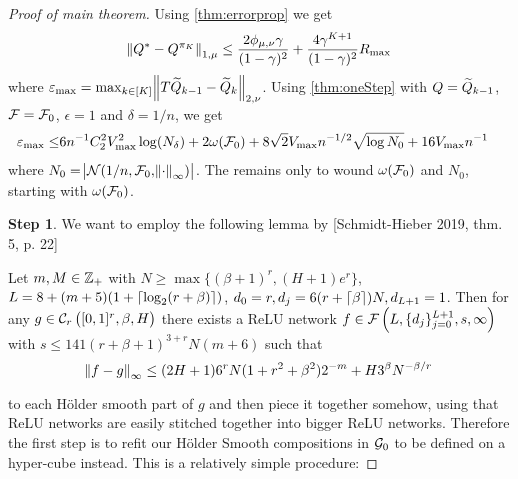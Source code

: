 




\begin{proof}[Proof of main theorem] %
  Using \cref{thm:errorprop} we get
  \begin{equation}
    \norm{Q^* - Q^{\pi_K}}_{1,\mu} \leq
    \frac{2 \phi_{\mu, \nu} \gamma}{(1-\gamma)^2} +
    \frac{4 \gamma^{K+1}}{(1-\gamma)^2} R_{\max}
    \label{eq:mp1}
  \end{equation}
  where $\varepsilon_{\max} =
  \max_{k \in [K]} \norm{T \widetilde{Q}_{k-1} - \widetilde{Q}_k}_{2, \nu}$.
  Using \cref{thm:oneStep} with $Q = \widetilde{Q}_{k-1}$,
  $\mathcal{F} = \mathcal{F}_0$, $\epsilon = 1$ and $\delta = 1/n$, we get
  \begin{align}
    \varepsilon_{\max} \leq & 6 n^{-1} C_2^2 V_{\max}^2 \log(N_\delta)
    + 2 \omega(\mathcal{F}_0)
    + 8 \sqrt{2} V_{\max} n^{-1/2} \sqrt{\log N_0}
    + 16 V_{\max} n^{-1}
    \label{eq:mp2}
  \end{align}
  where $N_0 = \abs{\mathcal{N}(1/n, \mathcal{F}_0, \norm{\cdot}_\infty)}$.
  The remains only to wound $\omega(\mathcal{F}_0)$ and $N_0$,
  starting with $\omega(\mathcal{F}_0)$.

  \textbf{Step 1}. %
  We want to employ the following lemma by [Schmidt-Hieber 2019, thm. 5, p. 22]
  \begin{lem}
    Let $m,M \in \mathbb{Z}_+$ with $N \geq \max\{(\beta + 1)^r, (H + 1) e^r\}$,
    $L = 8 + (m + 5) (1 + \lceil\log_2(r + \beta)\rceil)$, 
    $d_0 = r, d_j = 6(r + \lceil\beta\rceil) N, d_{L+1} = 1$.
    Then for any $g \in \mathcal{C}_r \left( [0,1]^r, \beta, H \right)$
    there exists a ReLU network
    $f \in \mathcal{F}\left(L, \{d_j\}_{j=0}^{L+1}, s, \infty \right)$
    with $s \leq 141 (r + \beta + 1)^{3 + r} N (m+6)$
    such that
    \begin{equation*}
      \norm{f - g}_\infty \leq (2 H + 1) 6^r N (1 + r^2 + \beta^2) 2^{-m}
      + H 3^{\beta} N^{-\beta/r}
    \end{equation*}
    \label{lem:holderapprox} 
  \end{lem} 
  \vspace*{-\baselineskip}
  to each Hölder smooth part of $g$ and then piece it together somehow,
  using that ReLU networks are easily stitched together into bigger
  ReLU networks.
  Therefore the first step is to refit our
  Hölder Smooth compositions in $\mathcal{G}_0$ to be defined on a hyper-cube instead.
  This is a relatively simple procedure:


\end{proof}
